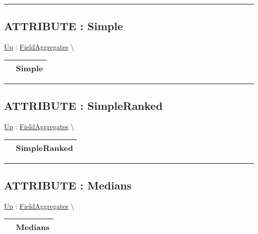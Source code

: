 \rule{\linewidth}{0.5pt}

\subsection*{ATTRIBUTE : Simple}
\hypertarget{ecldoc:ml_core.fieldaggregates.simple}{}
\hyperlink{ecldoc:ml_core.fieldaggregates}{Up} :
\hspace{0pt} \hyperlink{ecldoc:ml_core.fieldaggregates}{FieldAggregates} \textbackslash 

{\renewcommand{\arraystretch}{1.5}
\begin{tabularx}{\textwidth}{|>{\raggedright\arraybackslash}l|X|}
\hline
\hspace{0pt} & Simple \\
\hline
\end{tabularx}
}

\par


\rule{\linewidth}{0.5pt}
\subsection*{ATTRIBUTE : SimpleRanked}
\hypertarget{ecldoc:ml_core.fieldaggregates.simpleranked}{}
\hyperlink{ecldoc:ml_core.fieldaggregates}{Up} :
\hspace{0pt} \hyperlink{ecldoc:ml_core.fieldaggregates}{FieldAggregates} \textbackslash 

{\renewcommand{\arraystretch}{1.5}
\begin{tabularx}{\textwidth}{|>{\raggedright\arraybackslash}l|X|}
\hline
\hspace{0pt} & SimpleRanked \\
\hline
\end{tabularx}
}

\par


\rule{\linewidth}{0.5pt}
\subsection*{ATTRIBUTE : Medians}
\hypertarget{ecldoc:ml_core.fieldaggregates.medians}{}
\hyperlink{ecldoc:ml_core.fieldaggregates}{Up} :
\hspace{0pt} \hyperlink{ecldoc:ml_core.fieldaggregates}{FieldAggregates} \textbackslash 

{\renewcommand{\arraystretch}{1.5}
\begin{tabularx}{\textwidth}{|>{\raggedright\arraybackslash}l|X|}
\hline
\hspace{0pt} & Medians \\
\hline
\end{tabularx}
}

